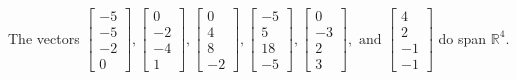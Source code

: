 \begin{exercise}
\begin{exerciseStatement}
  \end{exerciseStatement}
  \begin{exerciseAnswer}
   The vectors \(\left[\begin{array}{r}
-5 \\
-5 \\
-2 \\
0
\end{array}\right] , \left[\begin{array}{r}
0 \\
-2 \\
-4 \\
1
\end{array}\right] , \left[\begin{array}{r}
0 \\
4 \\
8 \\
-2
\end{array}\right] , \left[\begin{array}{r}
-5 \\
5 \\
18 \\
-5
\end{array}\right] , \left[\begin{array}{r}
0 \\
-3 \\
2 \\
3
\end{array}\right] , \text{ and } \left[\begin{array}{r}
4 \\
2 \\
-1 \\
-1
\end{array}\right]\) 
  	 do  
	span \(\mathbb{R}^4\).
  


  \end{exerciseAnswer}
\end{exercise}